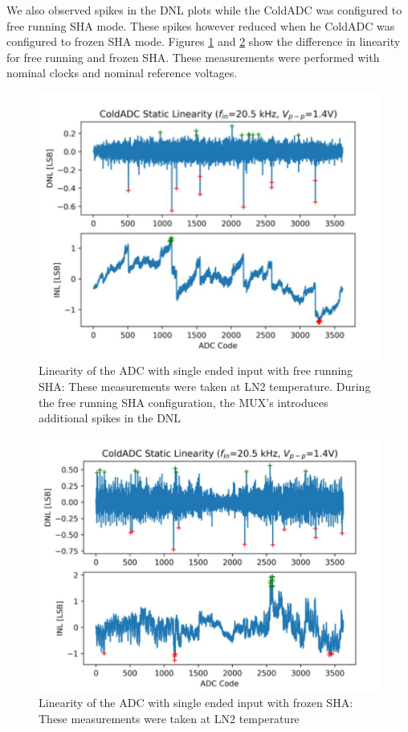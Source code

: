 We also observed spikes in the DNL plots while the ColdADC was configured to free running SHA mode. These spikes however reduced when he ColdADC was configured to frozen SHA mode. Figures \ref{fig:linearity_freesha} and \ref{fig:linearity_frozensha} show the difference in linearity for free running and frozen SHA. These measurements were performed with nominal clocks and nominal reference voltages.  
\begin{figure}[h!]
\centering
  \includegraphics[width=0.7\linewidth]{figures/prakash_fig/linearity_freesha.JPG}
  \caption[Linearity of the ADC with single ended input with free running SHA]{Linearity of the ADC with single ended input with free running SHA: These measurements were taken at LN2 temperature. During the free running SHA configuration, the MUX's introduces additional spikes in the DNL}
  \label{fig:linearity_freesha}
\end{figure}
\begin{figure}[h!]
\centering
  \includegraphics[width=0.7\linewidth]{figures/prakash_fig/linearity_frozensha.JPG}
  \caption[Linearity of the ADC with single ended input with frozen SHA]{Linearity of the ADC with single ended input with frozen SHA: These measurements were taken at LN2 temperature}
  \label{fig:linearity_frozensha}
\end{figure}

